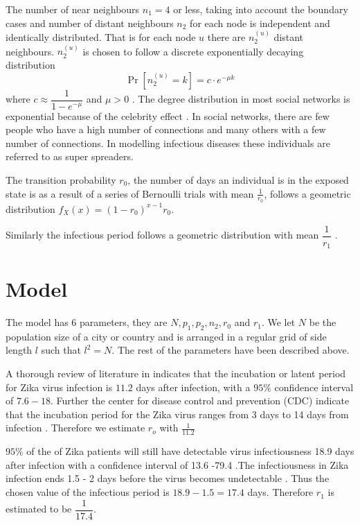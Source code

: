 The number of near neighbours $n_1 = 4$ or less, taking into account the boundary cases and number of distant neighbours $n_2$  for each node is independent and  identically distributed. That is for each node $u$ there are $n_2^ {(u)}$ distant neighbours. $n_2^ {(u)} $ is chosen to follow a discrete exponentially decaying distribution 
\begin{equation} 
 \Pr[n_2^{(u)} = k] = c \cdot e^{-\mu k  } \label{5.2.1}
 \end{equation}
 where $c \approx \dfrac{1}{1- e^{-\mu }}$ and $\mu >0$ \citep{fu2013propagation}.
 The degree distribution in most social networks is exponential because of the celebrity effect \citep{estrada2015first}. In social networks, there are few people who have a high number of connections and many others with a few number of connections. In modelling infectious diseases these individuals are referred to as super spreaders.

 The transition probability $r_0$, the number of days an individual is in the exposed state is as a result of a series of Bernoulli trials with mean $\frac{1}{r_0}$, follows a geometric distribution $f_X (x) = (1-r_0) ^ {x-1} r_0$.

 Similarly the infectious period follows a geometric distribution with mean $\dfrac{1}{r_1}$ \citep{fu2013propagation}.

\section{Model}
The model has 6 parameters, they are $N, p_1, p_2, n_2, r_0$ and $r_1$. We let $N$ be the population size of a city or country and is arranged in a regular grid of side length $l $ such that $l^2 = N$. The rest of the parameters have been described above.

A thorough review of literature in \cite{lessler2016times} indicates that the incubation or latent period for Zika virus infection is $11.2$ days after infection, with a $95 \%$ confidence interval of $7.6 -18$. Further the center for disease control and prevention (CDC)
indicate that the incubation period for the Zika virus ranges from 3 days to 14 days from infection \citep{krow2017estimated}. Therefore we estimate $r_o$ with $\frac{1}{11.2}$
  
    $95\%$ of the of Zika patients will still have detectable virus infectiousness 18.9 days after infection with a confidence interval of 13.6 -79.4 \citep{lessler2016times}.The infectiousness in Zika infection ends 1.5 - 2 days before the virus becomes undetectable \citep{funk2016comparative}. Thus the chosen value of the infectious period is $18.9 - 1.5 = 17.4$ days. Therefore $r_1$ is estimated to be $\dfrac{1}{17.4}$.

